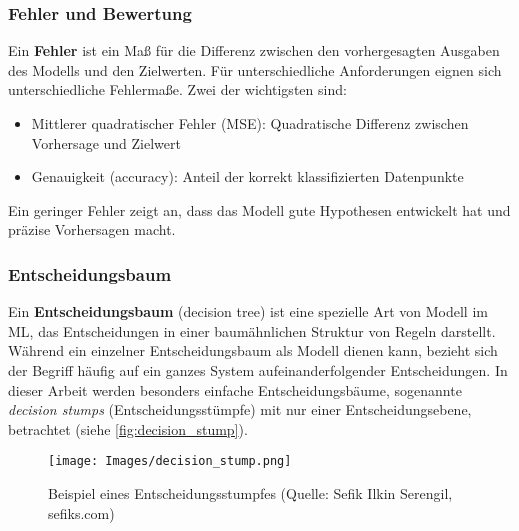 \subsubsection{Fehler und Bewertung}
Ein \textbf{Fehler} ist ein Maß für die Differenz zwischen den vorhergesagten Ausgaben des Modells und den Zielwerten. Für unterschiedliche Anforderungen eignen sich unterschiedliche Fehlermaße. Zwei der wichtigsten sind:

\begin{itemize}
    \item Mittlerer quadratischer Fehler (MSE): Quadratische Differenz zwischen Vorhersage und Zielwert
    \item Genauigkeit (accuracy): Anteil der korrekt klassifizierten Datenpunkte
\end{itemize}
Ein geringer Fehler zeigt an, dass das Modell gute Hypothesen entwickelt hat und präzise Vorhersagen macht.

\subsubsection{Entscheidungsbaum}
Ein \textbf{Entscheidungsbaum} (decision tree) ist eine spezielle Art von Modell im ML, das Entscheidungen in einer baumähnlichen Struktur von Regeln darstellt. Während ein einzelner Entscheidungsbaum als Modell dienen kann, bezieht sich der Begriff häufig auf ein ganzes System aufeinanderfolgender Entscheidungen. In dieser Arbeit werden besonders einfache Entscheidungsbäume, sogenannte \textit{decision stumps} (Entscheidungsstümpfe) mit nur einer Entscheidungsebene, betrachtet (siehe \autoref{fig:decision_stump}).

\begin{figure}[h]
    \centering
    \texttt{[image: Images/decision\_stump.png]}
    \caption[Beispiel eines Entscheidungsstumpfes]{Beispiel eines Entscheidungsstumpfes (Quelle: Sefik Ilkin Serengil, sefiks.com)}
    \label{fig:decision_stump}
\end{figure}

